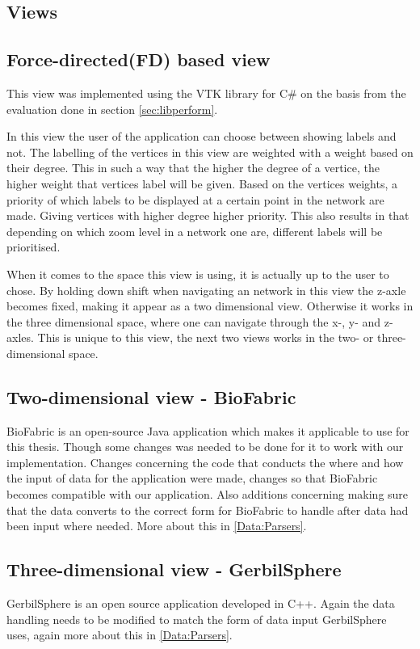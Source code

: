 \documentclass[a4paper,11pt]{kth-mag}
\begin{document}
\begin{appendices}
\section{Views}
\subsection{Force-directed(FD) based view}
\label{FD:View:appendix}
This view was implemented using the VTK library for C\# on the basis 
from the evaluation done in section \ref{sec:libperform}.

In this view the user of the application can choose between showing labels and not. The labelling of the vertices in this view are weighted with a weight based on their degree. This in such a way that the higher
 the degree of a vertice, the higher weight that vertices label will be given. Based on the vertices weights, a priority of which labels to be displayed at a certain point in the network are made. Giving vertices
 with higher degree higher priority. This also results in that depending on which zoom level in a network one are, different labels will be prioritised.

 When it comes to the space this view is using, it is actually up to the user to chose. By holding down shift when navigating an network in this view the z-axle becomes fixed, making it appear as a two dimensional view. 
Otherwise it works in the three dimensional space, where one can navigate through the x-, y- and z-axles. This is unique to this view, the next two views works in the two- or three-dimensional space. 

\subsection{Two-dimensional view - BioFabric}
BioFabric is an open-source Java application which makes it applicable to use for this thesis. Though some changes was needed to be done for it to work with our implementation. Changes concerning the code that conducts the where
and how the input of data for the application were made, changes so that BioFabric becomes compatible with our application. Also additions concerning making sure that the data converts to the correct form for BioFabric to handle
 after data had been input where needed. More about this in \ref{Data:Parsers}.

\subsection{Three-dimensional view - GerbilSphere}
GerbilSphere is an open source application developed in C++. Again the data handling needs to be modified to match the form of data input GerbilSphere uses,
again more about this in \ref{Data:Parsers}.


\end{appendices}
\end{document}

